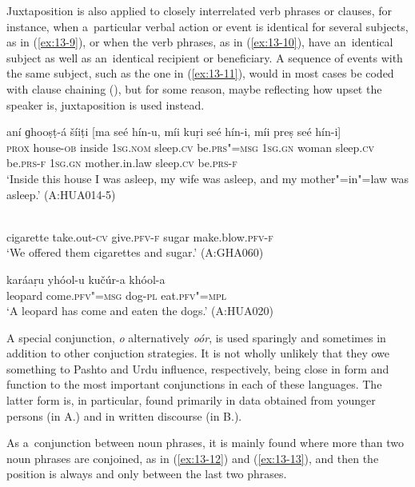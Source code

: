 Juxtaposition is also applied to closely interrelated verb phrases or clauses, for instance, when a~particular verbal action or event is identical for several subjects, as in (\ref{ex:13-9}), or when the verb phrases, as in (\ref{ex:13-10}), have an~identical subject as well as an~identical recipient or beneficiary. A sequence of events with the same subject, such as the one in (\ref{ex:13-11}), would in most cases be coded with clause chaining (), but for some reason, maybe reflecting how upset the speaker is, juxtaposition is used instead.

\begin{exe}
\ex
\label{ex:13-9}
\gll aní ɡhooṣṭ-á šíiṭi [ma seé hín-u, míi kuṛi seé hín-i, míi preṣ seé hín-i] \\
\textsc{prox} house-\textsc{ob} inside \textsc{1sg.nom} sleep.\textsc{cv} be.\textsc{prs"=msg}  \textsc{1sg.gn} woman sleep.\textsc{cv} be.\textsc{prs-f } \textsc{1sg.gn} mother.in.law sleep.\textsc{cv} be.\textsc{prs-f} \\
\glt `Inside this house I was asleep, my wife was asleep, and my mother"=in"=law was asleep.' (A:HUA014-5)

\ex
\label{ex:13-10}
  \\
cigarette take.out-\textsc{cv} give.\textsc{pfv-f} sugar make.blow.\textsc{pfv-f} \\
\glt `We offered them cigarettes and sugar.' (A:GHA060)

\ex
\label{ex:13-11}
\gll karáaṛu yhóol-u kučúr-a khóol-a  \\
leopard come.\textsc{pfv"=msg} dog-\textsc{pl} eat.\textsc{pfv"=mpl} \\
\glt `A leopard has come and eaten the dogs.' (A:HUA020) 
\end{exe}

 A special conjunction, \textit{o} alternatively \textit{oór}, is used sparingly and sometimes in addition to other conjuction strategies. It is not wholly unlikely that they owe something to Pashto and Urdu influence, respectively, being close in form and function to the most important conjunctions in each of these languages. The latter form is, in particular, found primarily in data obtained from younger persons (in A.) and in written discourse (in B.). 


As a~conjunction between noun phrases, it is mainly found where more than two noun phrases are conjoined, as in (\ref{ex:13-12}) and (\ref{ex:13-13}), and then the position is always and only between the last two phrases.

